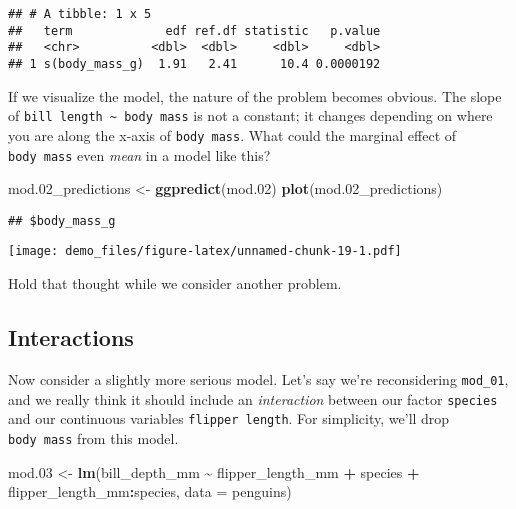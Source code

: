 \documentclass[
]{article}
\newenvironment{Shaded}{\begin{snugshade}}{\end{snugshade}}
\newcommand{\AttributeTok}[1]{\textcolor[rgb]{0.13,0.29,0.53}{#1}}
\newcommand{\FloatTok}[1]{\textcolor[rgb]{0.00,0.00,0.81}{#1}}
\newcommand{\FunctionTok}[1]{\textcolor[rgb]{0.13,0.29,0.53}{\textbf{#1}}}
\newcommand{\NormalTok}[1]{#1}
\newcommand{\OtherTok}[1]{\textcolor[rgb]{0.56,0.35,0.01}{#1}}
\newcommand{\SpecialCharTok}[1]{\textcolor[rgb]{0.81,0.36,0.00}{\textbf{#1}}}
\begin{document}
\begin{verbatim}
## # A tibble: 1 x 5
##   term             edf ref.df statistic   p.value
##   <chr>          <dbl>  <dbl>     <dbl>     <dbl>
## 1 s(body_mass_g)  1.91   2.41      10.4 0.0000192
\end{verbatim}

If we visualize the model, the nature of the problem becomes obvious.
The slope of \texttt{bill\ length\ \textasciitilde{}\ body\ mass} is not
a constant; it changes depending on where you are along the x-axis of
\texttt{body\ mass}. What could the marginal effect of
\texttt{body\ mass} even \emph{mean} in a model like this?

\begin{Shaded}
\begin{Highlighting}[]
\NormalTok{mod}\FloatTok{.02}\NormalTok{\_predictions }\OtherTok{\textless{}{-}} \FunctionTok{ggpredict}\NormalTok{(mod}\FloatTok{.02}\NormalTok{)}
\FunctionTok{plot}\NormalTok{(mod}\FloatTok{.02}\NormalTok{\_predictions)}
\end{Highlighting}
\end{Shaded}

\begin{verbatim}
## $body_mass_g
\end{verbatim}

\texttt{[image: demo\_files/figure-latex/unnamed-chunk-19-1.pdf]}

Hold that thought while we consider another problem.

\hypertarget{interactions}{%
\subsection{Interactions}\label{interactions}}

Now consider a slightly more serious model. Let's say we're
reconsidering \texttt{mod\_01}, and we really think it should include an
\emph{interaction} between our factor \texttt{species} and our
continuous variables \texttt{flipper\ length}. For simplicity, we'll
drop \texttt{body\ mass} from this model.

\begin{Shaded}
\begin{Highlighting}[]
\NormalTok{mod}\FloatTok{.03} \OtherTok{\textless{}{-}} \FunctionTok{lm}\NormalTok{(bill\_depth\_mm }\SpecialCharTok{\textasciitilde{}}
\NormalTok{               flipper\_length\_mm }\SpecialCharTok{+}
\NormalTok{               species }\SpecialCharTok{+}
\NormalTok{               flipper\_length\_mm}\SpecialCharTok{:}\NormalTok{species,}
             \AttributeTok{data =}\NormalTok{ penguins)}
\end{Highlighting}
\end{Shaded}
\end{document}

